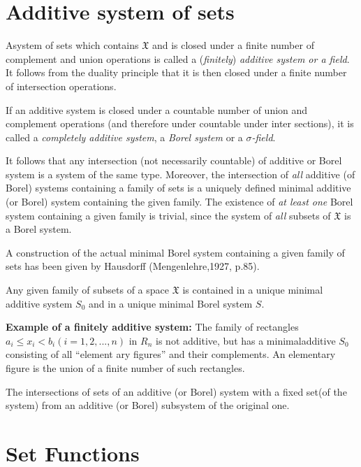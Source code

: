 \section{Additive system of sets}\label{chap1:sec3}

A\pageoriginale system of sets which contains $\mathfrak{X}$ and is closed under a
finite number of complement and union operations is called a ({\em finitely})
{\em additive system or a field}. It follows from the duality principle that
it is then closed under a finite number of intersection operations. 

If an additive system is closed under a countable number of union and
complement operations (and therefore under countable under inter sections),
it is called a {\em completely additive system}, a {\em Borel system} or a
{\em $\sigma$-field}. 

It follows that any intersection (not necessarily countable) of
additive or Borel system is a system of the same type. Moreover, the
intersection of {\em all} additive (of Borel) systems containing a
family of sets is a uniquely defined minimal additive (or Borel)
system containing the given
family. The existence of {\em at least one} Borel system containing a given
family is trivial, since the system of {\em all} subsets of $\mathfrak{X}$ is a
Borel system. 

A construction of the actual minimal Borel system containing a given
family of sets has been given by Hausdorff (Mengenlehre,1927, p.85). 

\begin{theorem}\label{chap1:sec3:thm1}
  Any given family of subsets of a space
  $\mathfrak{X}$ is contained in a unique minimal additive system $S_0$
  and in a unique minimal Borel system $S$. 
\end{theorem}

\noindent
{\bf Example of a finitely additive system:} The family
  of rectangles $a_i \le x_i < b_i(i=1,2,...,n)$ in $R_n$ is not
  additive, but has a minimal\pageoriginale additive $S_0$ consisting of all ``element
  ary figures'' and their complements. An elementary figure is the
  union of a finite number of such rectangles. 

The intersections of sets of an additive (or Borel) system with a
fixed set(of the system) from an additive (or Borel) subsystem of the
original one. 

\section{Set Functions}\label{chap1:sec4}


